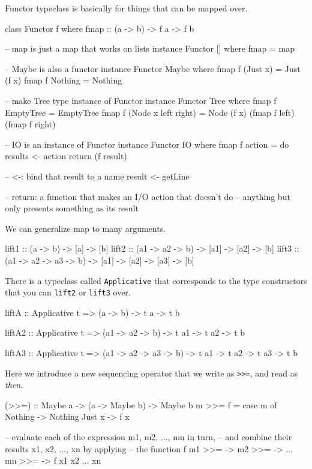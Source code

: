 Functor typeclass is basically for things that can be mapped over. 
\begin{haskellcode}
class Functor f where  
    fmap :: (a -> b) -> f a -> f b

-- map is just a map that works on lists
instance Functor [] where
	fmap = map

-- Maybe is also a functor
instance Functor Maybe where
	fmap f (Just x) = Just (f x)
	fmap f Nothing = Nothing

-- make Tree type instance of Functor
instance Functor Tree where
	fmap f EmptyTree = EmptyTree
	fmap f (Node x left right) = Node (f x) (fmap f left) (fmap f right)

-- IO is an instance of Functor
instance Functor IO where
	fmap f action = do
		results <- action
		return (f result)

-- <-: bind that result to a name
result <- getLine

-- return: a function that makes an I/O action that doesn't do 
-- 		   anything but only presents something as its result

\end{haskellcode}


We can generalize map to many arguments.
\begin{haskellcode}
lift1 :: (a -> b) -> [a] -> [b]
lift2 :: (a1 -> a2 -> b) -> [a1] -> [a2] -> [b]
lift3 :: (a1 -> a2 -> a3 -> b) -> [a1] -> [a2] -> [a3] -> [b]
\end{haskellcode}

There is a typeclass called \texttt{Applicative} that corresponds to 
the type constructors that you can \texttt{lift2} or \texttt{lift3} over.

\begin{haskellcode}
liftA  :: Applicative t => (a -> b) -> t a -> t b

liftA2 :: Applicative t 
	   => (a1 -> a2 -> b) 
       -> t a1 
       -> t a2 
       -> t b

liftA3 :: Applicative t 
       => (a1 -> a2 -> a3 -> b) 
       -> t a1 
       -> t a2
       -> t a3
       -> t b
\end{haskellcode}	


Here we introduce a new sequencing operator that we write as 
\texttt{>>=}, and read as \textit{then}.

\begin{haskellcode}
(>>=)   :: Maybe a -> (a -> Maybe b) -> Maybe b
m >>= f =  case m of
             Nothing -> Nothing
             Just x  -> f x

-- evaluate each of the expression m1, m2, ..., mn in turn,
-- and combine their results x1, x2, ..., xn by applying 
-- the function f
m1 >>=  ->
  m2 >>=  ->
  ...
    mn >>= \xn ->
      f x1 x2 ... xn
\end{haskellcode}


